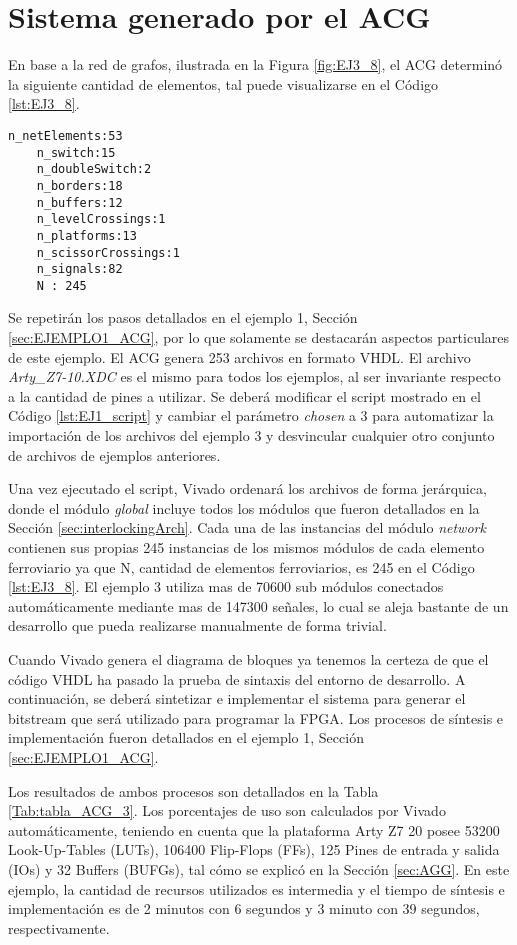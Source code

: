 \section{Sistema generado por el ACG}

	En base a la red de grafos, ilustrada en la Figura \ref{fig:EJ3_8}, el ACG determinó la siguiente cantidad de elementos, tal puede visualizarse en el Código \ref{lst:EJ3_8}.
	
	\begin{lstlisting}[language = {}, caption = Cantidad de elementos a implementar por el ACG, label = {lst:EJ3_8}]
	n_netElements:53
	n_switch:15
	n_doubleSwitch:2
	n_borders:18
	n_buffers:12
	n_levelCrossings:1
	n_platforms:13
	n_scissorCrossings:1
	n_signals:82
	N : 245
	\end{lstlisting}
	
	Se repetirán los pasos detallados en el ejemplo 1, Sección \ref{sec:EJEMPLO1_ACG}, por lo que solamente se destacarán aspectos particulares de este ejemplo. El ACG genera 253 archivos en formato VHDL. El archivo \textit{Arty\_Z7-10.XDC} es el mismo para todos los ejemplos, al ser invariante respecto a la cantidad de pines a utilizar. Se deberá modificar el script mostrado en el Código \ref{lst:EJ1_script} y cambiar el parámetro \textit{chosen} a 3 para automatizar la importación de los archivos del ejemplo 3 y desvincular cualquier otro conjunto de archivos de ejemplos anteriores.
	
	Una vez ejecutado el script, Vivado ordenará los archivos de forma jerárquica, donde el módulo \textit{global} incluye todos los módulos que fueron detallados en la Sección \ref{sec:interlockingArch}. Cada una de las instancias del módulo \textit{network} contienen sus propias 245 instancias de los mismos módulos de cada elemento ferroviario ya que N, cantidad de elementos ferroviarios, es 245 en el Código \ref{lst:EJ3_8}. El ejemplo 3 utiliza mas de 70600 sub módulos conectados automáticamente mediante mas de 147300 señales, lo cual se aleja bastante de un desarrollo que pueda realizarse manualmente de forma trivial.
	
	Cuando Vivado genera el diagrama de bloques ya tenemos la certeza de que el código VHDL ha pasado la prueba de sintaxis del entorno de desarrollo. A continuación, se deberá sintetizar e implementar el sistema para generar el bitstream que será utilizado para programar la FPGA. Los procesos de síntesis e implementación fueron detallados en el ejemplo 1, Sección \ref{sec:EJEMPLO1_ACG}.
	
	Los resultados de ambos procesos son detallados en la Tabla \ref{Tab:tabla_ACG_3}. Los porcentajes de uso son calculados por Vivado automáticamente, teniendo en cuenta que la plataforma Arty Z7 20 posee 53200 Look-Up-Tables (LUTs), 106400 Flip-Flops (FFs), 125 Pines de entrada y salida (IOs) y 32 Buffers (BUFGs), tal cómo se explicó en la Sección \ref{sec:AGG}. En este ejemplo, la cantidad de recursos utilizados es intermedia y el tiempo de síntesis e implementación es de 2 minutos con 6 segundos y 3 minuto con 39 segundos, respectivamente.

